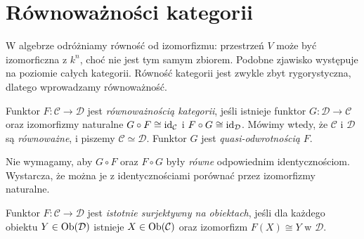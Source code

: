 \section{Równoważności kategorii}\label{sec:equivalence}

W algebrze odróżniamy równość od izomorfizmu: przestrzeń $V$ może być izomorficzna z $k^n$, choć nie jest tym samym zbiorem. Podobne zjawisko występuje na poziomie całych kategorii. Równość kategorii jest zwykle zbyt rygorystyczna, dlatego wprowadzamy równoważność.

\begin{definicja}\label{def:equivalence}
Funktor $F:\mathcal C\to\mathcal D$ jest \emph{równoważnością kategorii}, jeśli istnieje funktor $G:\mathcal D\to\mathcal C$ oraz izomorfizmy naturalne $G\circ F\cong\mathrm{id}_{\mathcal C}$ i $F\circ G\cong\mathrm{id}_{\mathcal D}$. Mówimy wtedy, że $\mathcal C$ i $\mathcal D$ są \emph{równoważne}, i piszemy $\mathcal C\simeq\mathcal D$. Funktor $G$ jest \emph{quasi-odwrotnością} $F$.
\end{definicja}

Nie wymagamy, aby $G\circ F$ oraz $F\circ G$ były \emph{równe} odpowiednim identycznościom. Wystarcza, że można je z identycznościami porównać przez izomorfizmy naturalne.

\begin{definicja}
Funktor $F:\mathcal C\to\mathcal D$ jest \emph{istotnie surjektywny na obiektach}, jeśli dla każdego obiektu $Y\in\operatorname{Ob}(\mathcal D)$ istnieje $X\in\operatorname{Ob}(\mathcal C)$ oraz izomorfizm $F(X)\cong Y$ w $\mathcal D$.
\end{definicja}

